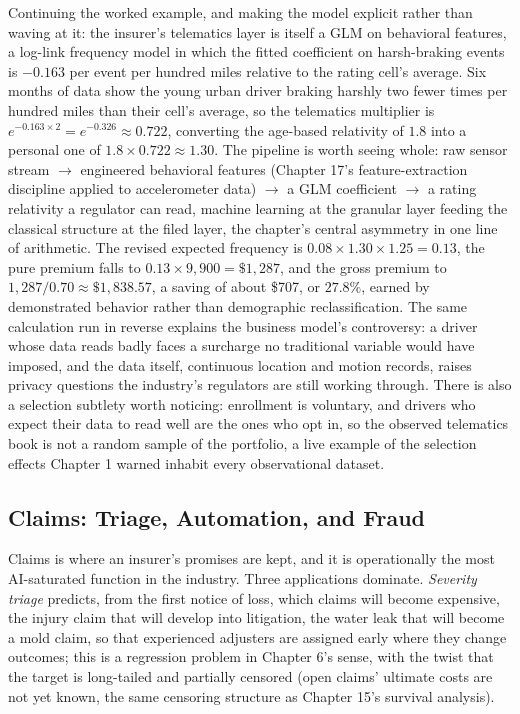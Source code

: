 \documentclass[../ai_in_finance]{subfiles}
\begin{document}
Continuing the worked example, and making the model explicit rather than waving at it: the insurer's telematics layer is itself a GLM on behavioral features, a log-link frequency model in which the fitted coefficient on harsh-braking events is $-0.163$ per event per hundred miles relative to the rating cell's average. Six months of data show the young urban driver braking harshly two fewer times per hundred miles than their cell's average, so the telematics multiplier is $e^{-0.163 \times 2} = e^{-0.326} \approx 0.722$, converting the age-based relativity of $1.8$ into a personal one of $1.8 \times 0.722 \approx 1.30$. The pipeline is worth seeing whole: raw sensor stream $\rightarrow$ engineered behavioral features (Chapter 17's feature-extraction discipline applied to accelerometer data) $\rightarrow$ a GLM coefficient $\rightarrow$ a rating relativity a regulator can read, machine learning at the granular layer feeding the classical structure at the filed layer, the chapter's central asymmetry in one line of arithmetic. The revised expected frequency is $0.08 \times 1.30 \times 1.25 = 0.13$, the pure premium falls to $0.13 \times 9{,}900 = \$1{,}287$, and the gross premium to $1{,}287/0.70 \approx \$1{,}838.57$, a saving of about \$707, or $27.8\%$, earned by demonstrated behavior rather than demographic reclassification. The same calculation run in reverse explains the business model's controversy: a driver whose data reads badly faces a surcharge no traditional variable would have imposed, and the data itself, continuous location and motion records, raises privacy questions the industry's regulators are still working through. There is also a selection subtlety worth noticing: enrollment is voluntary, and drivers who expect their data to read well are the ones who opt in, so the observed telematics book is not a random sample of the portfolio, a live example of the selection effects Chapter 1 warned inhabit every observational dataset.

\subsection{Claims: Triage, Automation, and Fraud}
\label{sec:ins-claims}

Claims is where an insurer's promises are kept, and it is operationally the most AI-saturated function in the industry. Three applications dominate. \emph{Severity triage} predicts, from the first notice of loss, which claims will become expensive, the injury claim that will develop into litigation, the water leak that will become a mold claim, so that experienced adjusters are assigned early where they change outcomes; this is a regression problem in Chapter 6's sense, with the twist that the target is long-tailed and partially censored (open claims' ultimate costs are not yet known, the same censoring structure as Chapter 15's survival analysis).
\end{document}
